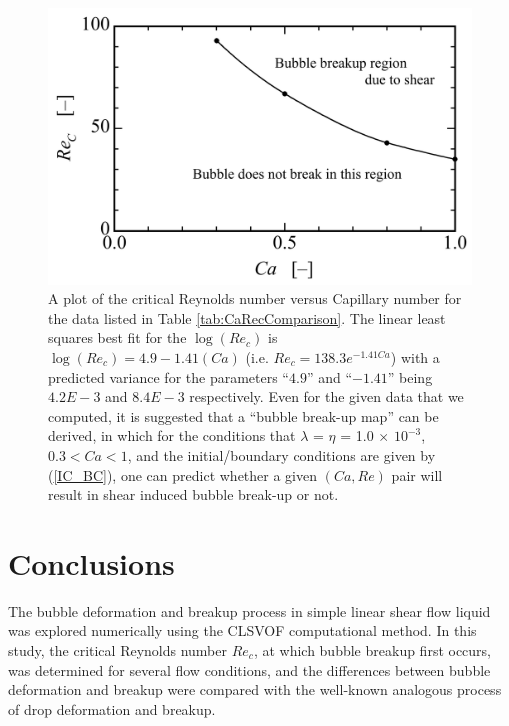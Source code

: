 \documentclass[%
 reprint,
 showkeys,
 amsmath,amssymb,
 aps,
 prfluids,
 onecolumn
]{revtex4-2}
\begin{document}
\begin{figure}%
  \centering
  \includegraphics[width=\textwidth]{Fig12-Critical-Re}
  \caption{A plot of the critical Reynolds number versus Capillary number
	for the data listed in Table \ref{tab:CaRecComparison}.  The
	linear least squares best fit for the $\log(Re_{c})$ is
	$\log(Re_{c})=4.9-1.41(Ca)$ (i.e. $Re_{c}=138.3 e^{-1.41 Ca}$)
	with a predicted variance
	for the parameters ``$4.9$'' and ``$-1.41$'' being
	$4.2E-3$ and $8.4E-3$ respectively.  Even for the
	given data that we computed, it is suggested that 
	a ``bubble break-up map''
	can be derived, in which for the conditions that
	$\lambda$ = $\eta$ = 1.0 $\times$ $10^{-3}$, $0.3<Ca<1$, and
        the initial/boundary conditions are given by (\ref{IC_BC}),	
	one
	can predict whether a given $(Ca,Re)$ pair will result in shear
	induced bubble break-up or not.  
	   }
  \label{fig:CaRecFit}
\end{figure}
%

\section{Conclusions}
The bubble deformation and breakup process in simple linear shear flow liquid
was explored numerically using the CLSVOF computational method.  In this study,
the critical Reynolds number $Re_{c}$, at which bubble breakup first occurs,
was determined for several flow conditions, and the differences between bubble
deformation and breakup were compared with the well-known analogous process of
drop deformation and breakup.
\end{document}
